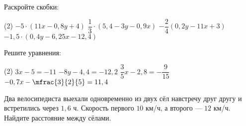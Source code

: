 \begin{homework}[number=3]
	\begin{listofex}
		\item Раскройте скобки:
		\begin{tasks}(2)
			\task \( -5 \cdot (11x-0,8y+4) \)
			\task \( \dfrac{ 1 }{ 3 } \cdot (5,4-3y-0,9x) \)
			\task \( -\dfrac{ 2 }{ 4 } \left( 0,2y-11x + 3 \right) \)
			\task \( -1,5 \cdot (0,4y-6,25x-12,4) \)
		\end{tasks}
		\item Решите уравнения:
		\begin{tasks}(2)
			\task \( 3x-5=-11 \)
			\task \( -8y-4,4=-12,2 \)
			\task \( \dfrac{ 3 }{ 5 }x-2,8=-\dfrac{ 9 }{ 15 } \)
			\task \( -0,7x-\mfrac{3 }{2 }{5 }=11,4 \)
		\end{tasks}
		\item Два велосипедиста выехали одновременно из двух сёл навстречу друг другу и встретились через \(1,6\) ч. Скорость первого \(10\) км/ч, а второго --- \(12\) км/ч. Найдите расстояние между сёлами.
	\end{listofex}
\end{homework}

